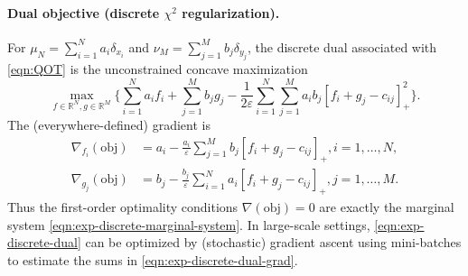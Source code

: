 \documentclass{article}
\theoremstyle{plain}
\theoremstyle{definition}
\theoremstyle{remark}
\numberwithin{equation}{section}
\newcommand{\R}{\mathbb{R}}
\begin{document}
\paragraph{Dual objective (discrete $\chi^2$ regularization).}
For $\mu_N=\sum_{i=1}^Na_i\delta_{x_i}$ and $\nu_M=\sum_{j=1}^Mb_j\delta_{y_j}$, the discrete dual associated with \eqref{eqn:QOT} is the unconstrained concave maximization
\begin{equation}\label{eqn:exp-discrete-dual}
\max_{f\in\R^N,g\in\R^M}\Big\{\sum_{i=1}^Na_if_i+\sum_{j=1}^Mb_jg_j-\frac{1}{2\varepsilon}\sum_{i=1}^N\sum_{j=1}^Ma_ib_j[f_i+g_j-c_{ij}]_+^2\Big\}.
\end{equation}
The (everywhere-defined) gradient is
\begin{equation}\label{eqn:exp-discrete-dual-grad}
\begin{aligned}
\nabla_{f_i}(\text{obj})&=a_i-\frac{a_i}{\varepsilon}\sum_{j=1}^Mb_j[f_i+g_j-c_{ij}]_+,i=1,\dots,N,\\
\nabla_{g_j}(\text{obj})&=b_j-\frac{b_j}{\varepsilon}\sum_{i=1}^Na_i[f_i+g_j-c_{ij}]_+,j=1,\dots,M.
\end{aligned}
\end{equation}
Thus the first-order optimality conditions $\nabla(\text{obj})=0$ are exactly the marginal system \eqref{eqn:exp-discrete-marginal-system}.
In large-scale settings, \eqref{eqn:exp-discrete-dual} can be optimized by (stochastic) gradient ascent using mini-batches to estimate the sums in \eqref{eqn:exp-discrete-dual-grad}.
\end{document}
